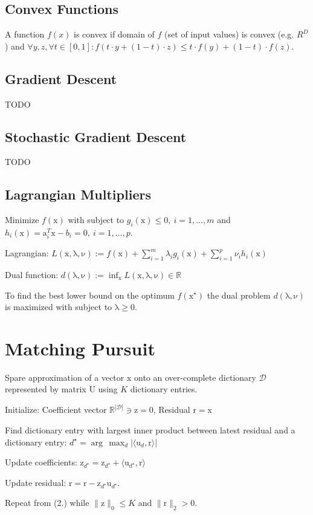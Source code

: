 \documentclass[a4paper, 11pt, landscape]{article}
\newcommand{\matr}[1]{\boldsymbol{\mathrm{#1}}}
\begin{document}
\begin{multicols*}{3}
\subsection{Convex Functions}
A function $f(x)$ is convex if domain of $f$ (set of input values) is convex (e.g. $R^D$) and $\forall y, z, \forall t \in [0, 1]: f(t \cdot y + (1-t) \cdot z) \leq t \cdot f(y) + (1-t) \cdot f(z)$.
\subsection{Gradient Descent}
TODO

\subsection{Stochastic Gradient Descent}
TODO

\subsection{Lagrangian Multipliers}
Minimize  $f(\matr{x})$ with subject to $g_i(\matr{x}) \leq 0,\ i = 1, \ldots, m$ and $h_i(\matr{x}) = \matr{a}_i^T \matr{x} - b_i = 0,\ i = 1, \ldots, p$.
\begin{compactdesc}
	\item[Lagrangian:] $L(\matr{x}, \matr{\lambda}, \matr{\nu}) := f(\matr{x}) + \sum_{i=1}^m \lambda_i g_i(\matr{x}) + \sum_{i=1}^p \nu_i h_i(\matr{x})$
	\item[Dual function:] $d(\matr{\lambda}, \matr{\nu}) := \inf_{\matr{x}} L(\matr{x}, \matr{\lambda}, \matr{\nu}) \in \mathbb{R}$
\end{compactdesc}
To find the best lower bound on the optimum $f(\matr{x}^\star)$ the dual problem $d(\matr{\lambda}, \matr{\nu})$ is maximized with subject to $\matr{\lambda} \geq \matr{0}$.

\section{Matching Pursuit}
Spare approximation of a vector $\matr{x}$ onto an over-complete dictionary $\mathcal{D}$ represented by matrix $\matr{U}$ using $K$ dictionary entries.
\begin{compactenum}
	\item Initialize: Coefficient vector $\mathbb{R}^{|\mathcal{D}|} \ni \matr{z} = \matr{0}$, Residual $\matr{r} = \matr{x}$
	\item Find dictionary entry with largest inner product between latest residual and a dictionary entry: $d^\star = \arg\,\max_d |\langle \matr{u}_d, \matr{r} \rangle|$
	\item Update coefficients: $\matr{z}_{d^\star} = \matr{z}_{d^\star} + \langle \matr{u}_{d^\star}, \matr{r} \rangle$
	\item Update residual: $\matr{r} = \matr{r} - \matr{z}_{d^\star} \matr{u}_{d^\star}$.
	\item Repeat from (2.) while $\|\matr{z}\|_0 \leq K$ and $\|\matr{r}\|_2 > 0$.
\end{compactenum}


\end{multicols*}
\end{document}
